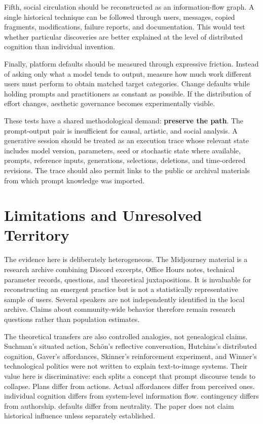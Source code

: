 \documentclass[11pt]{article}
\begin{document}
Fifth, social circulation should be reconstructed as an information-flow graph. A single historical technique can be followed through users, messages, copied fragments, modifications, failure reports, and documentation. This would test whether particular discoveries are better explained at the level of distributed cognition than individual invention.

Finally, platform defaults should be measured through expressive friction. Instead of asking only what a model tends to output, measure how much work different users must perform to obtain matched target categories. Change defaults while holding prompts and practitioners as constant as possible. If the distribution of effort changes, aesthetic governance becomes experimentally visible.

These tests have a shared methodological demand: \textbf{preserve the path}. The prompt-output pair is insufficient for causal, artistic, and social analysis. A generative session should be treated as an execution trace whose relevant state includes model version, parameters, seed or stochastic state where available, prompts, reference inputs, generations, selections, deletions, and time-ordered revisions. The trace should also permit links to the public or archival materials from which prompt knowledge was imported.

\section{Limitations and Unresolved Territory}

The evidence here is deliberately heterogeneous. The Midjourney material is a research archive combining Discord excerpts, Office Hours notes, technical parameter records, questions, and theoretical juxtapositions. It is invaluable for reconstructing an emergent practice but is not a statistically representative sample of users. Several speakers are not independently identified in the local archive. Claims about community-wide behavior therefore remain research questions rather than population estimates.

The theoretical transfers are also controlled analogies, not genealogical claims. Suchman's situated action, Schön's reflective conversation, Hutchins's distributed cognition, Gaver's affordances, Skinner's reinforcement experiment, and Winner's technological politics were not written to explain text-to-image systems. Their value here is discriminative: each splits a concept that prompt discourse tends to collapse. Plans differ from actions. Actual affordances differ from perceived ones. individual cognition differs from system-level information flow. contingency differs from authorship. defaults differ from neutrality. The paper does not claim historical influence unless separately established.
\end{document}
